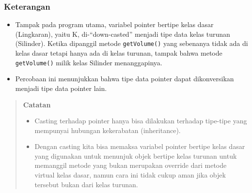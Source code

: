 \subsubsection*{Keterangan}

\begin{itemize}

\item
 Tampak pada program utama, variabel pointer bertipe kelas dasar
 (Lingkaran), yaitu K, di-``down-casted'' menjadi tipe data kelas
 turunan (Silinder). Ketika dipanggil metode \texttt{getVolume()} yang
 sebenanya tidak ada di kelas dasar tetapi hanya ada di kelas turunan,
 tampak bahwa metode \texttt{getVolume()} milik kelas Silinder
 menanggapinya.
\item
 Percobaan ini menunjukkan bahwa tipe data pointer dapat dikonversikan
 menjadi tipe data pointer lain.
\end{itemize}

\begin{quotation}
 {\LARGE {}} \textbf{Catatan}
	\begin{itemize}
 \item[\ding{45}] Casting terhadap pointer hanya bisa dilakukan terhadap tipe-tipe yang
 mempunyai hubungan kekerabatan (inheritance).
 \item[\ding{45}] Dengan casting kita bisa memaksa variabel pointer bertipe kelas dasar yang
 digunakan untuk menunjuk objek bertipe kelas turunan untuk memanggil
 metode yang bukan merupakan override dari metode virtual kelas dasar,
 namun cara ini tidak cukup aman jika objek tersebut bukan dari kelas
 turunan.
	\end{itemize}
\end{quotation}


